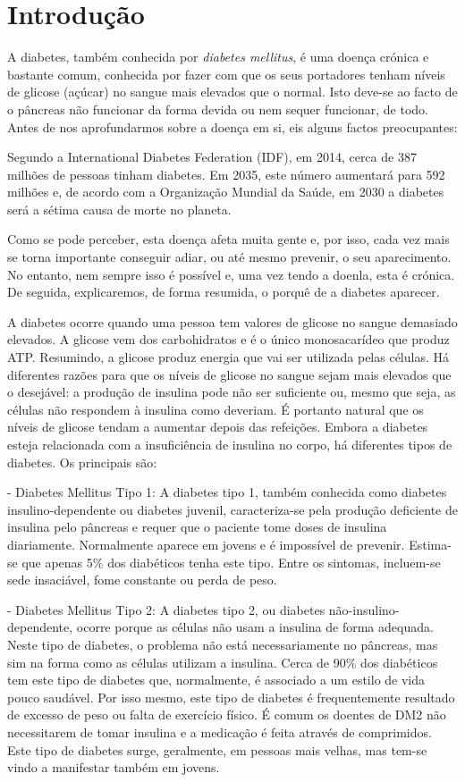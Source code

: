 \chapter{Introdução}\label{chap:intro}


A diabetes, também conhecida por \textit{diabetes mellitus}, é uma doença crónica e bastante comum, conhecida por fazer com que os seus portadores tenham níveis de glicose (açúcar) no sangue mais elevados que o normal. Isto deve-se ao facto de o pâncreas não funcionar da forma devida ou nem sequer funcionar, de todo. Antes de nos aprofundarmos sobre a doença em si, eis alguns factos preocupantes:

Segundo a International Diabetes Federation (IDF), em 2014, cerca de 387 milhões de pessoas tinham diabetes. Em 2035, este número aumentará para 592 milhões e, de acordo com a Organização Mundial da Saúde, em 2030 a diabetes será a sétima causa de morte no planeta.

Como se pode perceber, esta doença afeta muita gente e, por isso, cada vez mais se torna importante conseguir adiar, ou até mesmo prevenir, o seu aparecimento. No entanto, nem sempre isso é possível e, uma vez tendo a doenla, esta é crónica. De seguida, explicaremos, de forma resumida, o porquê de a diabetes aparecer.

A diabetes ocorre quando uma pessoa tem valores de glicose no sangue demasiado elevados. A glicose vem dos carbohidratos e é o único monosacarídeo que produz ATP. Resumindo, a glicose produz energia que vai ser utilizada pelas células. Há diferentes razões para que os níveis de glicose no sangue sejam mais elevados que o desejável: a produção de insulina pode não ser suficiente ou, mesmo que seja, as células não respondem à insulina como deveriam. É portanto natural que os níveis de glicose tendam a aumentar depois das refeições. Embora a diabetes esteja relacionada com a insuficiência de insulina no corpo, há diferentes tipos de diabetes. Os principais são:

- Diabetes Mellitus Tipo 1: A diabetes tipo 1, também conhecida como diabetes insulino-dependente ou diabetes juvenil, caracteriza-se pela produção deficiente de insulina pelo pâncreas e requer que o paciente tome doses de insulina diariamente. Normalmente aparece em jovens e é impossível de prevenir. Estima-se que apenas 5\% dos diabéticos tenha este tipo. Entre os sintomas, incluem-se sede insaciável, fome constante ou perda de peso.

- Diabetes Mellitus Tipo 2: A diabetes tipo 2, ou diabetes não-insulino-dependente, ocorre porque as células não usam a insulina de forma adequada. Neste tipo de diabetes, o problema não está necessariamente no pâncreas, mas sim na forma como as células utilizam a insulina. Cerca de 90\% dos diabéticos tem este tipo de diabetes que, normalmente, é associado a um estilo de vida pouco saudável. Por isso mesmo, este tipo de diabetes é frequentemente resultado de excesso de peso ou falta de exercício físico. É comum os doentes de DM2 não necessitarem de tomar insulina e a medicação é feita através de comprimidos. Este tipo de diabetes surge, geralmente, em pessoas mais velhas, mas tem-se vindo a manifestar também em jovens.

